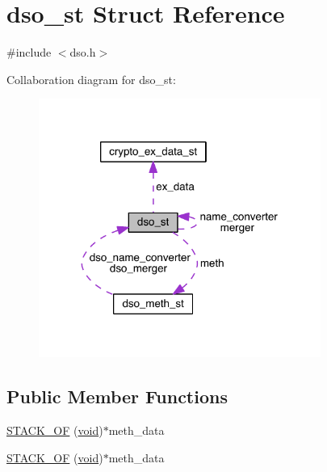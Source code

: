 \hypertarget{structdso__st}{}\section{dso\+\_\+st Struct Reference}
\label{structdso__st}


{\ttfamily \#include $<$dso.\+h$>$}



Collaboration diagram for dso\+\_\+st\+:\nopagebreak
\begin{figure}[H]
\begin{center}
\leavevmode
\includegraphics[width=262pt]{structdso__st__coll__graph}
\end{center}
\end{figure}
\subsection*{Public Member Functions}
\begin{DoxyCompactItemize}
\item 
\hyperlink{structdso__st_a723bfafc208c41e9617309f119174714}{S\+T\+A\+C\+K\+\_\+\+OF} (\hyperlink{hw__4758__cca_8h_afad4d591c7931ff6dc5bf69c76c96aa0}{void})$\ast$meth\+\_\+data
\item 
\hyperlink{structdso__st_a723bfafc208c41e9617309f119174714}{S\+T\+A\+C\+K\+\_\+\+OF} (\hyperlink{hw__4758__cca_8h_afad4d591c7931ff6dc5bf69c76c96aa0}{void})$\ast$meth\+\_\+data
\end{DoxyCompactItemize}
